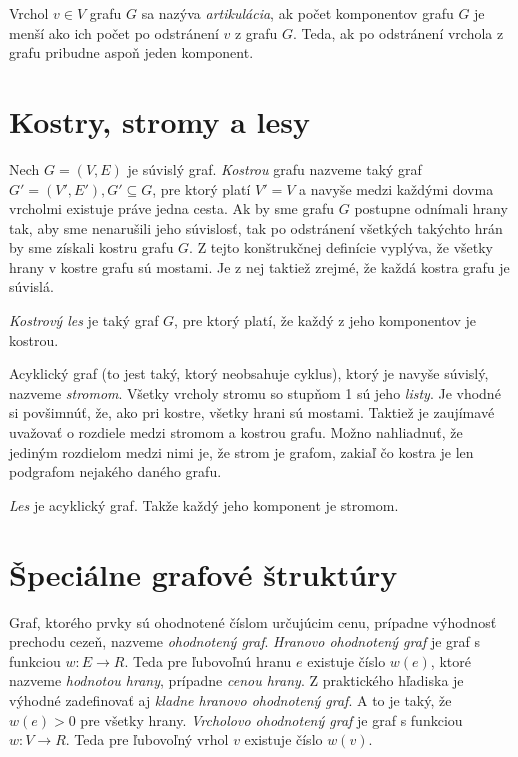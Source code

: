 Vrchol $v \in V$ grafu $G$ sa nazýva \textit{artikulácia}, ak počet komponentov grafu $G$ je menší ako ich počet po odstránení $v$ z grafu $G$. Teda, ak po odstránení vrchola z grafu pribudne aspoň jeden komponent.\newline

\section{Kostry, stromy a lesy}

Nech $G = (V, E)$ je súvislý graf. \textit{Kostrou} grafu nazveme taký graf $G' = (V', E'), G'\subseteq G$, pre ktorý platí $V' = V$ a navyše medzi každými dovma vrcholmi existuje práve jedna cesta. Ak by sme grafu $G$ postupne odnímali hrany tak, aby sme nenarušili jeho súvislosť, tak po odstránení všetkých takýchto hrán by sme získali kostru grafu $G$. Z tejto konštrukčnej definície vyplýva, že všetky hrany v kostre grafu sú mostami. Je z nej taktiež zrejmé, že každá kostra grafu je súvislá.\newline

\textit{Kostrový les} je taký graf $G$, pre ktorý platí, že každý z jeho komponentov je kostrou.\newline

Acyklický graf (to jest taký, ktorý neobsahuje cyklus), ktorý je navyše súvislý, nazveme \textit{stromom}. Všetky vrcholy stromu so stupňom 1 sú jeho \textit{listy}. Je vhodné si povšimnúť, že, ako pri kostre, všetky hrani sú mostami. Taktiež je zaujímavé uvažovať o rozdiele medzi stromom a kostrou grafu. Možno nahliadnuť, že jediným rozdielom medzi nimi je, že strom je grafom, zakiaľ čo kostra je len podgrafom nejakého daného grafu.\newline

\textit{Les} je acyklický graf. Takže každý jeho komponent je stromom.\newline

\section{Špeciálne grafové štruktúry}

Graf, ktorého prvky sú ohodnotené číslom určujúcim cenu, prípadne výhodnosť prechodu cezeň, nazveme \textit{ohodnotený graf}. \textit{Hranovo ohodnotený graf} je graf s funkciou $w: E\rightarrow R$. Teda pre ľubovoľnú hranu $e$ existuje číslo $w(e)$, ktoré nazveme \textit{hodnotou hrany}, prípadne \textit{cenou hrany}.  Z praktického hľadiska je výhodné zadefinovať aj \textit{kladne hranovo ohodnotený graf}. A to je taký, že $w(e) > 0$ pre všetky hrany. \textit{Vrcholovo ohodnotený graf} je graf s funkciou $w: V\rightarrow R$. Teda pre ľubovoľný vrhol $v$ existuje číslo $w(v)$. \newline

